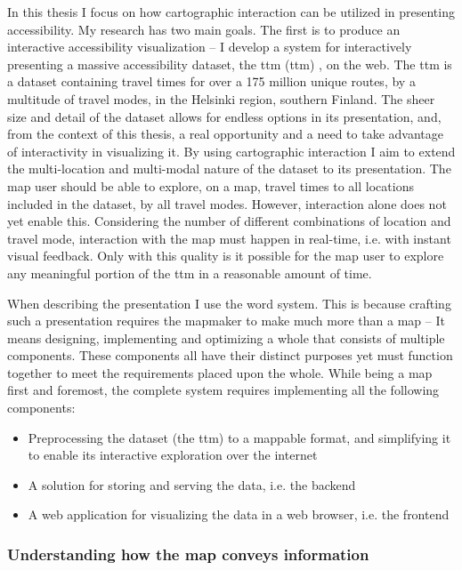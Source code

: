 In this thesis I focus on
how cartographic interaction can be utilized in presenting accessibility.
My research has two main goals.
The first is to produce an interactive accessibility visualization --
I develop a system for interactively presenting a massive accessibility dataset,
the \acrlong{ttm} (\acrshort{ttm}) \parencite{fin2023},
on the web.  %
The \acrshort{ttm} is a dataset containing travel times for
over a 175 million unique routes, by a multitude of travel modes,
in the Helsinki region, southern Finland.
The sheer size and detail of the dataset allows for endless options
in its presentation, and, from the context of this thesis,
a real opportunity and a need to take advantage of interactivity in visualizing it.
By using cartographic interaction
I aim to extend the multi-location and multi-modal nature of the dataset
to its presentation.
The map user should be able to explore, on a map,
travel times to all locations included in the dataset,
by all travel modes.
However, interaction alone does not yet enable this.
Considering the number of different combinations of location and travel mode,
interaction with the map must happen in real-time,
i.e. with instant visual feedback.
Only with this quality is it possible for the map user to
explore any meaningful portion of the \acrshort{ttm}
in a reasonable amount of time.

When describing the presentation I use the word system.
This is because crafting such a presentation
requires the mapmaker to make much more than a map --
It means designing, implementing and optimizing
a whole that consists of multiple components.
These components all have their distinct purposes yet must function together
to meet the requirements placed upon the whole.
While being a map first and foremost, the complete system
requires implementing all the following components:
\begin{itemize}
	\item Preprocessing the dataset (the \acrshort{ttm}) to a mappable format,
	and simplifying it to enable its interactive exploration over the internet
	\item A solution for storing and serving the data, i.e. the backend
	\item A web application for visualizing the data in a web browser, i.e. the frontend
\end{itemize}

\subsubsection{Understanding how the map conveys information}

